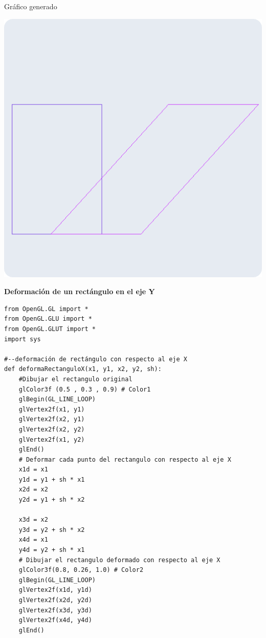 \documentclass[a4paper]{article}
\begin{document}
\newpage
Gráfico generado 
\begin{center}
\includegraphics[width=16cm]{src/1.png}
\end{center}
\newpage
\Large{\textbf{Deformación de un rectángulo en el eje Y}}\\[-0.4cm]
\begin{center}
\begin{mycodeboxl}
\begin{lstlisting}
from OpenGL.GL import *
from OpenGL.GLU import *
from OpenGL.GLUT import *
import sys
 
#--deformación de rectángulo con respecto al eje X
def deformaRectanguloX(x1, y1, x2, y2, sh):
    #Dibujar el rectangulo original
    glColor3f (0.5 , 0.3 , 0.9) # Color1
    glBegin(GL_LINE_LOOP)
    glVertex2f(x1, y1)
    glVertex2f(x2, y1)
    glVertex2f(x2, y2)
    glVertex2f(x1, y2)
    glEnd()
    # Deformar cada punto del rectangulo con respecto al eje X
    x1d = x1 
    y1d = y1 + sh * x1
    x2d = x2 
    y2d = y1 + sh * x2
 
    x3d = x2 
    y3d = y2 + sh * x2
    x4d = x1 
    y4d = y2 + sh * x1
    # Dibujar el rectangulo deformado con respecto al eje X
    glColor3f(0.8, 0.26, 1.0) # Color2
    glBegin(GL_LINE_LOOP)
    glVertex2f(x1d, y1d)
    glVertex2f(x2d, y2d)
    glVertex2f(x3d, y3d)
    glVertex2f(x4d, y4d)
    glEnd()
\end{lstlisting}
\end{mycodeboxl}
\end{center}
\end{document}
